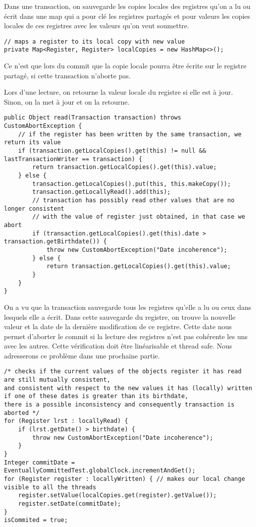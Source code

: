 \documentclass[10pt, a4paper]{article}
\begin{document}
Dans une transaction, on sauvegarde les copies locales des registres qu'on a lu ou écrit dans une map qui a pour clé les registres partagés et pour valeurs les copies locales de ces registres avec les valeurs qu'on veut soumettre.
\begin{lstlisting}[caption = localCopies]
// maps a register to its local copy with new value
private Map<Register, Register> localCopies = new HashMap<>(); 
\end{lstlisting}

Ce n'est que lors du commit que la copie locale pourra être écrite sur le registre partagé, si cette transaction n'aborte pas.

Lors d'une lecture, on retourne la valeur locale du registre si elle est à jour. Sinon, on la met à jour et on la retourne.
\begin{lstlisting}[caption = read]
public Object read(Transaction transaction) throws CustomAbortException {
    // if the register has been written by the same transaction, we return its value
    if (transaction.getLocalCopies().get(this) != null && lastTransactionWriter == transaction) {
        return transaction.getLocalCopies().get(this).value;
    } else {
        transaction.getLocalCopies().put(this, this.makeCopy());
        transaction.getLocallyRead().add(this);
        // transaction has possibly read other values that are no longer consistent
        // with the value of register just obtained, in that case we abort
        if (transaction.getLocalCopies().get(this).date > transaction.getBirthdate()) {
            throw new CustomAbortException("Date incoherence");
        } else {
            return transaction.getLocalCopies().get(this).value;
        }
    }
}
\end{lstlisting}

On a vu que la transaction sauvegarde tous les registres qu'elle a lu ou ceux dans lesquels elle a écrit. Dans cette sauvegarde du registre, on trouve la nouvelle valeur et la date de la dernière modification de ce registre. Cette date nous permet d'aborter le commit si la lecture des registres n'est pas cohérente les uns avec les autres. Cette vérification doit être linéarisable et thread safe. Nous adresserons ce problème dans une prochaine partie.
\begin{lstlisting}[caption = commit]
/* checks if the current values of the objects register it has read are still mutually consistent,
and consistent with respect to the new values it has (locally) written
if one of these dates is greater than its birthdate,
there is a possible inconsistency and consequently transaction is aborted */
for (Register lrst : locallyRead) {
    if (lrst.getDate() > birthdate) {
        throw new CustomAbortException("Date incoherence");
    }
}
Integer commitDate = EventuallyCommittedTest.globalClock.incrementAndGet();
for (Register register : locallyWritten) { // makes our local change visible to all the threads
    register.setValue(localCopies.get(register).getValue());
    register.setDate(commitDate);
}
isCommited = true;
\end{lstlisting}
\end{document}
